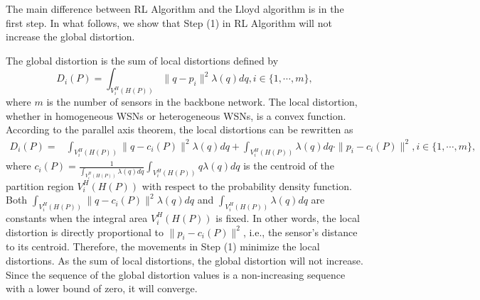 \documentclass[journal,draftcls,onecolumn,12pt,twoside, narroweqnarray]{IEEEtran}
\begin{document}
The main difference between RL Algorithm and the Lloyd algorithm is in the first step.
In what follows, we show that Step (1) in RL Algorithm will not increase the global distortion.





The global distortion is the sum of local distortions defined by
\begin{equation}
D_i(P) = \int_{V^H_i(H(P))}\|q-p_i\|^2\lambda(q)dq, i\in\{1,\cdots,m\},
\end{equation}
where $m$ is the number of sensors in the backbone network.
The local distortion, whether in homogeneous WSNs or heterogeneous WSNs, is a convex function. According to the parallel axis theorem, the local distortions can be rewritten as
\begin{equation}
\begin{aligned}
\label{aa}
D_i(P) =& \int_{V^H_i(H(P))}\|q-c_i(P)\|^2\lambda(q)dq + \int_{V^H_i(H(P))}\lambda(q)dq \cdot \|p_i-c_i(P)\|^2, i\in\{1,\cdots,m\},
\end{aligned}
\end{equation}
where $c_i(P) = \frac{1}{\int_{V^H_i(H(P))}\lambda(q)dq}\int_{V^H_i(H(P))}q\lambda(q)dq$ is the centroid of the partition region $V^H_i(H(P))$ with respect to the probability density function. Both $\int_{V^H_i(H(P))}\|q-c_i(P)\|^2\lambda(q)dq$ and $\int_{V^H_i(H(P))}\lambda(q)dq$ are constants when the integral area $V^H_i(H(P))$ is fixed. In other words, the local distortion is directly proportional to $\|p_i-c_i(P)\|^2$, i.e., the  sensor's distance to its centroid. Therefore, the movements in Step (1) minimize the local distortions. As the sum of local distortions, the global distortion will not increase. Since the sequence of the global distortion values is a non-increasing sequence with a lower bound of zero, it will converge.
\end{document}
